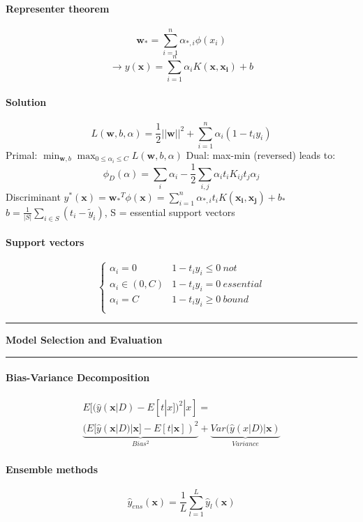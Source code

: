 \documentclass[7pt]{scrartcl}
\newlength{\secskip}
\renewcommand{\section}[1]{
  \vspace{\secskip}
  \hrule\vspace{.4em}
  \textbf{#1}
  \vspace{.4em}
  \hrule
  \vspace{\secskip}
}
\renewcommand{\vec}{\mathbf}
\begin{document}
\begin{multicols}{4}
\paragraph{Representer theorem}
\[\vec{w_*} = \sum_{i=1}^n \alpha_{*,i} \phi(x_i)\]
\[\rightarrow y(\vec{x}) = \sum_{i=1}^n \alpha_i K(\vec{x},\vec{x_i})+b\]
\paragraph{Solution}
\[L(\vec{w},b,\alpha) = \frac{1}{2}||\vec{w}||^2 + \sum_{i=1}^n \alpha_i(1-t_iy_i)\]
Primal: $\min_{\vec{w},b} \max_{0 \leq \alpha_i \leq C} L(\vec{w},b,\alpha)$
Dual: max-min (reversed) leads to:
\[\phi_D(\alpha) = \sum_i \alpha_i - \frac{1}{2} \sum_{i,j} \alpha_i t_i K_{ij} t_j \alpha_j\]
Discriminant $y^*(\vec{x}) = \vec{w_*}^T \phi(\vec{x}) = \sum_{i=1}^n \alpha_{*,i} t_i K(\vec{x_i},\vec{x_j}) + b_*$\\
$b = \frac{1}{|S|} \sum_{i \in S} (t_i - \tilde{y}_i)$, S = essential support vectors
\paragraph{Support vectors}
\begin{equation*}
\left\lbrace
\begin{array}{ll}
\alpha_i = 0 & 1-t_iy_i \leq 0 ~not \\
\alpha_i \in (0,C) & 1-t_iy_i = 0 ~essential\\
\alpha_i = C & 1-t_iy_i \geq 0 ~bound\\
\end{array}
\right.
\end{equation*}

\section{Model Selection and Evaluation}
\paragraph{Bias-Variance Decomposition}
\begin{align*}
E[(\hat{y}(\vec{x}|D) - E[t|x])^2|x] = \\ \underbrace{(E[\hat{y}(\vec{x}|D)|\vec{x}] - E[t|\vec{x}])^2}_{Bias^2} + \underbrace{Var(\hat{y}(x|D) | \vec{x})}_{Variance}
\end{align*}
\paragraph{Ensemble methods}
\[\hat{y}_{ens}(\vec{x}) = \frac{1}{L} \sum_{l=1}^L \hat{y}_l(\vec{x})\]

\end{multicols}
\end{document}
